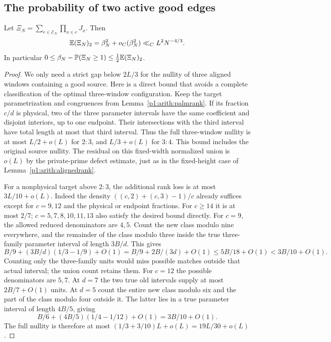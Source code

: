 \subsection{The probability of two active good edges}

\begin{lemma}
\label{p1:arith:twogoodpositive}
Let $\Xi_N=\sum_{e\in\mathcal E_N}\prod_{x\in e}J_x$.
Then
\[
 \mathbb E(\Xi_N)_2=\beta_N^2+o_C(\beta_N^2)
 \ll_C L^2N^{-4/3}.
\]
In particular
$0\leq\beta_N-\mathbb P(\Xi_N\geq1)\leq\tfrac12\mathbb E(\Xi_N)_2$.
\end{lemma}

\begin{proof}
We only need a strict gap below $2L/3$ for the nullity of three aligned
windows containing a good source.  Here is a direct bound that avoids
a complete classification of the optimal three-window configuration.
Keep the target parametrization and congruences from
Lemma~\ref{p1:arith:palmrank}.  If its fraction $c/d$ is physical,
two of the three parameter intervals have the same coefficient and
disjoint interiors, up to one endpoint.  Their intersections with the
third interval have total length at most that third interval.  Thus
the full three-window nullity is at most $L/2+o(L)$ for $2:3$, and
$L/3+o(L)$ for $3:4$.  This bound includes the original source nullity.
The residual on this fixed-width normalized union is $o(L)$ by the
private-prime defect estimate, just as in the fixed-height case of
Lemma~\ref{p1:arith:alignedrank}.

For a nonphysical target above $2:3$, the additional rank loss is at
most $3L/10+o(L)$.  Indeed the density
$((c,2)+(c,3)-1)/c$ already suffices except for $c=9,12$ and the
physical or endpoint fractions.  For $c\geq14$ it is at most $2/7$;
$c=5,7,8,10,11,13$ also satisfy the desired bound directly.
For $c=9$, the allowed reduced denominators are $4,5$.
Count the new class modulo nine everywhere, and the remainder of
the class modulo three inside the true three-family parameter
interval of length $3B/d$.  This gives
\[
 B/9+(3B/d)(1/3-1/9)+O(1)
 =B/9+2B/(3d)+O(1)\leq5B/18+O(1)<3B/10+O(1).
\]
Counting only the three-family units would miss possible matches
outside that actual interval; the union count retains them.
For $c=12$ the possible denominators are $5,7$.
At $d=7$ the two true old intervals supply at most $2B/7+O(1)$ units.
At $d=5$ count the entire new class modulo six and the part of the
class modulo four outside it.  The latter lies in a true parameter
interval of length $4B/5$, giving
\[
 B/6+(4B/5)(1/4-1/12)+O(1)=3B/10+O(1).
\]
The full nullity is therefore at most $(1/3+3/10)L+o(L)=19L/30+o(L)$.


\end{proof}
